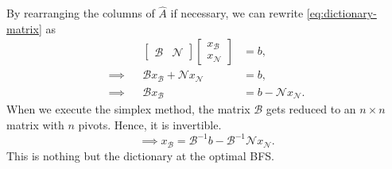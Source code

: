 \documentclass[
]{book}
\theoremstyle{definition}
\theoremstyle{definition}
\theoremstyle{definition}
\theoremstyle{definition}
\theoremstyle{remark}
\begin{document}
By rearranging the columns of \(\widehat{A}\) if necessary, we can rewrite \eqref{eq:dictionary-matrix} as
\begin{align*}
  && 
    \begin{bmatrix} \mathcal{B} & \mathcal{N} \end{bmatrix}
    \begin{bmatrix} x_{\mathcal{B}} \\ x_{\mathcal{N}} \end{bmatrix}
      &= b,\\
  \implies 
  &&
    \mathcal{B} x_{\mathcal{B}} + \mathcal{N} x_{\mathcal{N}} &= b, \\
  \implies
  &&
    \mathcal{B} x_{\mathcal{B}} &= b -  \mathcal{N} x_{\mathcal{N}}.
\end{align*}
When we execute the simplex method, the matrix \(\mathcal{B}\) gets reduced to an \(n \times n\) matrix with \(n\) pivots. Hence, it is invertible.
\begin{equation}
  \implies x_{\mathcal{B}} = \mathcal{B}^{-1} b - \mathcal{B}^{-1} \mathcal{N} x_{\mathcal{N}}.
  \label{eq:basic-non-basic-matrix}
\end{equation}
This is nothing but the dictionary at the optimal BFS.
\end{document}
